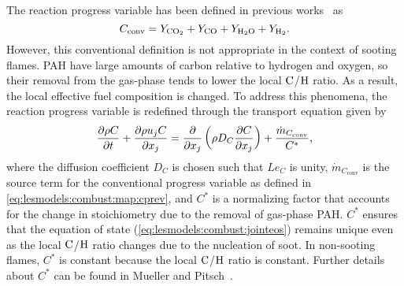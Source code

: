 The reaction progress variable has been defined in previous works~\cite{pierce2004,ihme2008} as
\begin{equation}\label{eq:lesmodels:combust:map:cprev}
  C_{\text{conv}} = Y_{\ce{CO2}} + Y_{\ce{CO}} + Y_{\ce{H2O}} + Y_{\ce{H2}}.
\end{equation}
However, this conventional definition is not appropriate in the context of sooting flames. PAH have large amounts of carbon relative to hydrogen and oxygen, so their removal from the gas-phase tends to lower the local $\ce{C}$/$\ce{H}$ ratio. As a result, the local effective fuel composition is changed. To address this phenomena, the reaction progress variable is redefined through the transport equation given by
\begin{equation}\label{eq:lesmodels:combust:map:c}
  \trder{C} = \pder[]{x_j}\left( \rho D_C \pder[C]{x_j} \right) + \frac{\dot{m}_{C_{\text{conv}}}}{C^*},
\end{equation}
where the diffusion coefficient $D_C$ is chosen such that $Le_C$ is unity, $\dot{m}_{C_{\text{conv}}}$ is the source term for the conventional progress variable as defined in \cref{eq:lesmodels:combust:map:cprev}, and $C^*$ is a normalizing factor that accounts for the change in stoichiometry due to the removal of gas-phase PAH. $C^*$ ensures that the equation of state (\cref{eq:lesmodels:combust:jointeos}) remains unique even as the local $\ce{C}$/$\ce{H}$ ratio changes due to the nucleation of soot. In non-sooting flames, $C^*$ is constant because the local $\ce{C}$/$\ce{H}$ ratio is constant. Further details about $C^*$ can be found in Mueller and Pitsch~\cite{mueller2012}.

